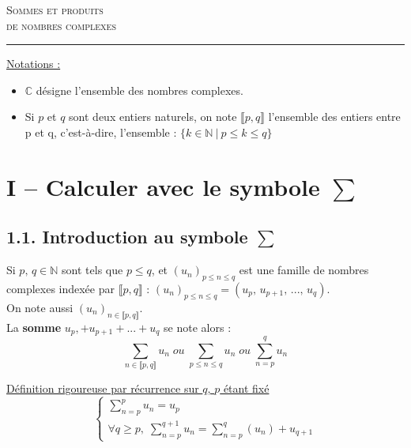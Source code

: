 \documentclass[a4paper,11pt]{article}
\newcommand{\N}{\mathbb{N}}
\newcommand{\C}{\mathbb{C}}
\newcommand{\intN}[2]{\llbracket #1, #2 \rrbracket}
\newcommand{\ens}[1]{\{#1\}}
\newcommand{\encadLEQ}[3]{#1 \leq #2 \leq #3}
\newcommand{\famille}[2]{(#1)_{#2}}
\newcommand{\mot}[1]{\textcolor{bordeaux}{\textbf{#1}}}
\begin{document}
\begin{center}
  {\LARGE\scshape\color{bordeaux} Sommes et produits\\[2pt] de nombres complexes}\\[2pt]
  {\color{brun}\rule{0.45\linewidth}{0.8pt}}
\end{center}

\begin{remarque}
	\textcolor{bordeaux}{\underline{Notations :}}
	\begin{itemize}
		\item $\C$ désigne l'ensemble des nombres complexes.
		\item Si $p$ et $q$ sont deux entiers naturels, on note $\intN{p}{q}$ l'ensemble des entiers entre p et q, c'est-à-dire, l'ensemble : $\ens{k\in\N \: | \: \encadLEQ{p}{k}{q}}$
	\end{itemize}
\end{remarque}

\section*{I -- Calculer avec le symbole $\sum$}
\subsection*{1.1. Introduction au symbole $\sum$}

Si $p,\, q \in \N$ sont tels que $p \leq q$, et $\famille{u_n}{\encadLEQ{p}{n}{q}}$ est une famille de nombres complexes indexée par $\intN{p}{q}$ : $\famille{u_n}{\encadLEQ{p}{n}{q}} = (u_p, \, u_{p+1}, \, ..., \, u_{q})$.\\
On note aussi $\famille{u_n}{n\in\intN{p}{q}}$.\\

La \mot{somme} $u_p, + u_{p+1} + ... + u_q$ se note alors :\\
$$\boxed{\sum_{n\in\intN{p}{q}}u_n \; ou \; \sum_{\encadLEQ{p}{n}{q}}u_n \; ou \; \sum_{n=p}^{q}u_n}$$

\begin{definition}
\textcolor{brun}{\underline{Définition rigoureuse par récurrence sur $q$, $p$ étant fixé}}\\
$$\begin{cases}
	\sum_{n=p}^{p}u_n = u_p \\
	\forall q \geq p, \; \sum_{n=p}^{q+1}u_n = \sum_{n=p}^{q}(u_n) + u_{q+1}
\end{cases}$$
\end{definition}
\end{document}

